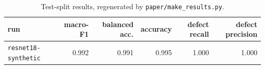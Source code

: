 \begin{table}[t]
\centering
\small
\caption{Test-split results, regenerated by \texttt{paper/make\_results.py}.}
\label{tab:synthetic}
\begin{tabular}{lrrrrr}
\toprule
run & macro-F1 & balanced acc. & accuracy & defect recall & defect precision \\
\midrule
\texttt{resnet18-synthetic} & 0.992 & 0.991 & 0.995 & 1.000 & 1.000 \\
\bottomrule
\end{tabular}
\end{table}
